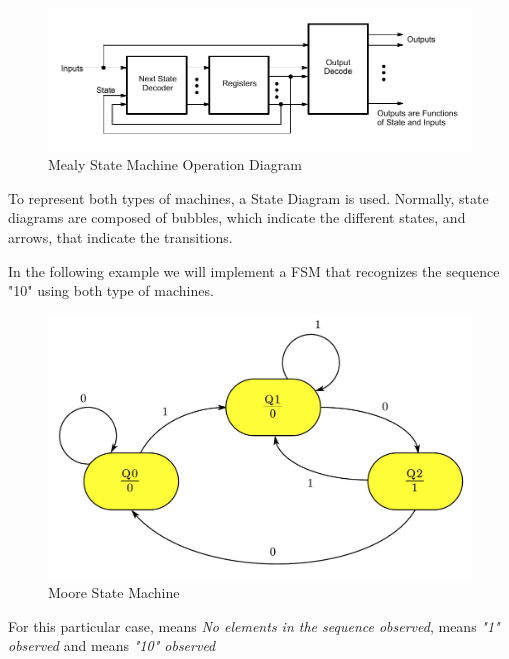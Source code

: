 \vspace{-0.3cm}

\begin{figure}[H]
    \centering
    \includegraphics[width = \textwidth]{Graphics/VHDL/Practice 4/MEALY.pdf}
    \caption{Mealy State Machine Operation Diagram ~\autocite{AMD}}
    \label{fig:MEALY}
\end{figure}


To represent both types of machines, a State Diagram is used. Normally, state diagrams are composed of bubbles, which indicate the different states, and arrows, that indicate the transitions.\medskip

In the following example we will implement a FSM that recognizes the sequence "10" using both type of machines.

\begin{figure}[H]
    \centering
    \includegraphics[scale = 0.55]{Graphics/VHDL/Practice 4/MOORE_FSM.pdf}
    \caption{Moore State Machine ~\autocite{SLIDES_4}}
    \label{fig:MOORE}
\end{figure}

For this particular case,  means \textit{No elements in the sequence observed},  means \textit{"1" observed} and  means \textit{"10" observed}

